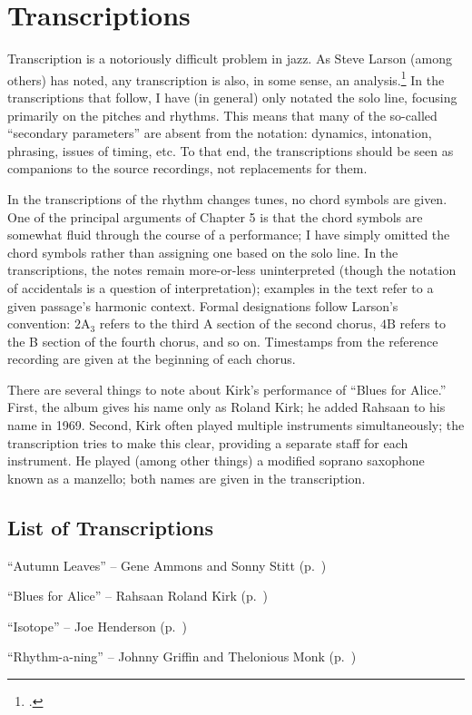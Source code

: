 \doublespacing
\chapter{Transcriptions}
\addtocspace
\singlespacing

Transcription is a notoriously difficult problem in jazz. As Steve Larson
(among others) has noted, any transcription is also, in some sense, an
analysis.\footcite[2]{larson:2009} In the transcriptions that follow, I have
(in general) only notated the solo line, focusing primarily on the pitches and
rhythms. This means that many of the so-called ``secondary parameters'' are
absent from the notation: dynamics, intonation, phrasing, issues of timing,
etc. To that end, the transcriptions should be seen as companions to the
source recordings, not replacements for them.

In the transcriptions of the rhythm changes tunes, no chord symbols are given.
One of the principal arguments of Chapter 5 is that the chord symbols are
somewhat fluid through the course of a performance; I have simply omitted the
chord symbols rather than assigning one based on the solo line. In the
transcriptions, the notes remain more-or-less uninterpreted (though the
notation of accidentals is a question of interpretation); examples in the text
refer to a given passage's harmonic context. Formal designations follow
Larson's convention: $2\mathrm{A}_3$ refers to the third A section of the
second chorus, $4\mathrm{B}$ refers to the B section of the fourth chorus, and
so on. Timestamps from the reference recording are given at the beginning of
each chorus.

There are several things to note about Kirk's performance of ``Blues for
Alice.'' First, the album gives his name only as Roland Kirk; he added Rahsaan
to his name in 1969. Second, Kirk often played multiple instruments
simultaneously; the transcription tries to make this clear, providing a
separate staff for each instrument. He played (among other things) a modified
soprano saxophone known as a manzello; both names are given in the
transcription.

\section*{List of Transcriptions}

\begin{compactitem}
    \item ``Autumn Leaves'' -- Gene Ammons and Sonny Stitt
      (p.~\pageref{transcription:autumn-leaves})
    \item ``Blues for Alice'' -- Rahsaan Roland Kirk
      (p.~\pageref{transcription:blues-for-alice})
    \item ``Isotope'' -- Joe Henderson (p.~\pageref{transcription:isotope})
    \item ``Rhythm-a-ning'' -- Johnny Griffin and Thelonious Monk
      (p.~\pageref{transcription:rhythm-a-ning})
\end{compactitem}
\nocite{ammons:stitt,henderson:isotope,monk:action,kirk:freekings}

